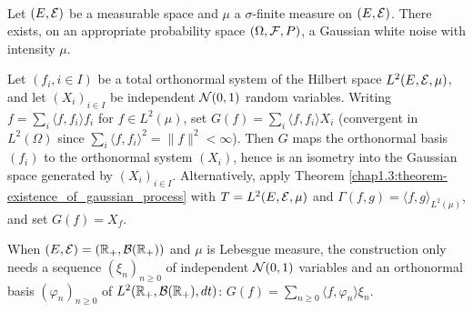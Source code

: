 \begin{proposition} \label{chap1.4:proposition-existence_of_gaussian_white_noise}
 \\
Let $(E,\mathcal{E})$ be a measurable space and $\mu$ a $\sigma$-finite measure on $(E,\mathcal{E})$. There exists, on an appropriate probability space $(\Omega,\mathcal{F},P)$, a Gaussian white noise with intensity $\mu$.
\end{proposition}
\begin{proofidea}
Let $(f_i,i\in I)$ be a total orthonormal system of the Hilbert space $L^2(E,\mathcal{E},\mu)$, and let $(X_i)_{i \in I}$ be independent $\mathcal{N}(0,1)$ random variables. Writing $f=\sum_{i}\langle f,f_i\rangle f_i$ for $f \in L^2(\mu)$, set $G(f)=\sum_i\langle f,f_i\rangle X_i$ (convergent in $L^2(\Omega)$ since $\sum_i\langle f,f_i\rangle^2=\|f\|^2<\infty$). Then $G$ maps the orthonormal basis $(f_i)$ to the orthonormal system $(X_i)$, hence is an isometry into the Gaussian space generated by $(X_i)_{i \in I}$. Alternatively, apply Theorem \ref{chap1.3:theorem-existence_of_gaussian_process} with $T=L^2(E,\mathcal{E},\mu)$ and $\Gamma(f,g)=\langle f,g \rangle_{L^2(\mu)}$, and set $G(f)=X_f$.
\end{proofidea}
\begin{remark}
When $(E,\mathcal{E})=(\mathbb{R}_+,\mathcal{B}(\mathbb{R}_+))$ and $\mu$ is Lebesgue measure, the construction only needs a sequence $(\xi_n)_{n\geq0}$ of independent $\mathcal{N}(0,1)$ variables and an orthonormal basis $(\varphi_n)_{n\geq0}$ of $L^2(\mathbb{R}_+,\mathcal{B}(\mathbb{R}_+),dt)$: $G(f)=\sum_{n\geq0}\langle f,\varphi_n\rangle\xi_n$.
\end{remark}

